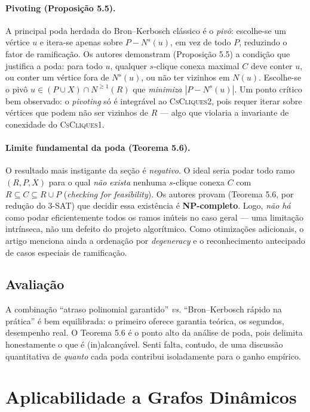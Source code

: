 \documentclass[12pt]{article}
\begin{document}
\paragraph{Pivoting (Proposição 5.5).} A principal poda herdada do
Bron--Kerbosch clássico é o \emph{pivô}: escolhe-se um vértice $u$ e itera-se
apenas sobre $P - N^s(u)$, em vez de todo $P$, reduzindo o fator de ramificação.
Os autores demonstram (Proposição 5.5) a condição que justifica a poda: para todo
$u$, qualquer $s$-clique conexa maximal $C$ deve conter $u$, ou conter um vértice
fora de $N^s(u)$, ou não ter vizinhos em $N(u)$. Escolhe-se o pivô
$u \in (P \cup X) \cap N^{\geq 1}(R)$ que \emph{minimiza} $|P - N^s(u)|$. Um
ponto crítico bem observado: o \emph{pivoting} só é integrável ao
\textsc{CsCliques2}, pois requer iterar sobre vértices que podem não ser vizinhos
de $R$ --- algo que violaria a invariante de conexidade do \textsc{CsCliques1}.

\paragraph{Limite fundamental da poda (Teorema 5.6).} O resultado mais
instigante da seção é \emph{negativo}. O ideal seria podar todo ramo
$(R, P, X)$ para o qual \emph{não exista} nenhuma $s$-clique conexa $C$ com
$R \subseteq C \subseteq R \cup P$ (\emph{checking for feasibility}). Os autores
provam (Teorema 5.6, por redução do 3-SAT) que decidir essa existência é
\textbf{NP-completo}. Logo, \emph{não há} como podar eficientemente todos os
ramos inúteis no caso geral --- uma limitação intrínseca, não um defeito do
projeto algorítmico. Como otimizações adicionais, o artigo menciona ainda a
ordenação por \emph{degeneracy} e o reconhecimento antecipado de casos especiais
de ramificação.

\subsection{Avaliação}

A combinação ``atraso polinomial garantido'' \emph{vs.} ``Bron--Kerbosch rápido
na prática'' é bem equilibrada: o primeiro oferece garantia teórica, os segundos,
desempenho real. O Teorema 5.6 é o ponto alto da análise de poda, pois delimita
honestamente o que é (in)alcançável. Senti falta, contudo, de uma discussão
quantitativa de \emph{quanto} cada poda contribui isoladamente para o ganho
empírico.

\section{Aplicabilidade a Grafos Dinâmicos}
\end{document}
